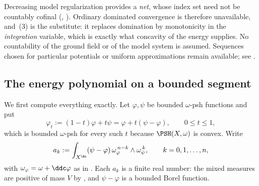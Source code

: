\begin{remark}
\label{rem:ch27-nets-here}
Decreasing model regularization 
provides a \emph{net}, whose index set need not be countably cofinal
(, ).  Ordinary
dominated convergence is therefore unavailable, and
\,(3) is the substitute: it replaces domination
by monotonicity in the \emph{integration} variable, which is exactly what
concavity of the energy supplies.  No countability of the ground field or
of the model system is assumed.  Sequences chosen for particular potentials
or uniform approximations remain available; see
.
\end{remark}

\subsection{The energy polynomial on a bounded segment}
\label{sec:ch27-energy-polynomial}

We first compute everything exactly.  Let $\varphi,\psi$ be bounded
$\omega$-psh functions and put
\[
 \varphi_t:=(1-t)\varphi+t\psi=\varphi+t(\psi-\varphi),
 \qquad 0\leq t\leq1,
\]
which is bounded $\omega$-psh for every such $t$ because
$\PSH(X,\omega)$ is convex.  Write
\begin{equation}\label{eq:ch27-mixed-coefficients}
 a_k:=\int_{X^{\An}}(\psi-\varphi)\,
       \omega_\varphi^{\,n-k}\wedge\omega_\psi^{\,k},
 \qquad k=0,1,\dots,n,
\end{equation}
with $\omega_\varphi=\omega+\ddc\varphi$ as in .
Each $a_k$ is a finite real number: the mixed measures are positive of
mass $V$ by , and $\psi-\varphi$ is a
bounded Borel function.

